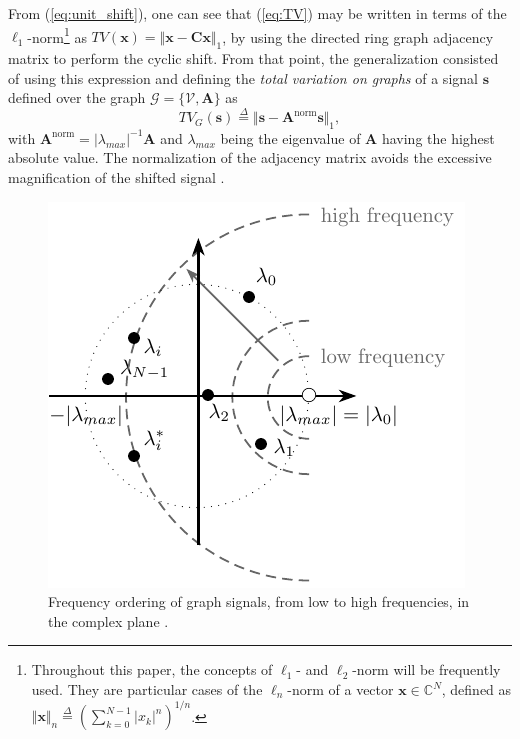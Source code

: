 From (\ref{eq:unit_shift}), one can see that (\ref{eq:TV}) may be written in terms of the $ \ell_1 $-norm\footnote{Throughout this paper, the concepts of $ \ell_1 $- and $ \ell_2 $-norm will be frequently used. They are particular cases of the $ \ell_n $-norm of a vector $ \mathbf{x} \in \mathbb{C}^{N} $, defined as $ \Vert \mathbf{x}\Vert_n \overset{\Delta}{=} \left(\sum_{k=0}^{N-1} |x_k|^n\right)^{1/n} $.}
as $ TV(\mathbf{x}) = \Vert \mathbf{x} - \mathbf{C x}\Vert_1 $, by using the directed ring graph adjacency matrix to perform the cyclic shift. From that point, the generalization consisted of using this expression and defining the \emph{total variation on graphs} of a signal $ \mathbf{s} $ defined over the graph $ \mathcal{G} = \{\mathcal{V}, \mathbf{A}\} $ as
\begin{equation}
TV_G(\mathbf{s}) \overset{\Delta}{=} \Vert \mathbf{s} - \mathbf{A}^{\text{norm}} \mathbf{s}\Vert_1,
\end{equation}
with $ \mathbf{A}^{\text{norm}} = |\lambda_{max}|^{-1}\mathbf{A} $ and $ \lambda_{max} $ being the eigenvalue of $ \mathbf{A} $ having the highest absolute value. The normalization of the adjacency matrix avoids the excessive magnification of the shifted signal \cite{sandryhaila2014frequency}.

\begin{figure}
	\centering
	\includegraphics[width=0.35\linewidth]{Figures/graph_frequency_EN.pdf}
	\caption{Frequency ordering of graph signals, from low to high frequencies, in the complex plane \cite{sandryhaila2014frequency}.}
	\label{fig:ordem_freq}
\end{figure}

